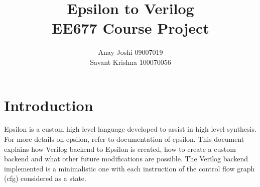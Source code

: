 \documentclass{article}
\begin{document}
    \title{\textbf{Epsilon to Verilog}\\[0.5cm] \large EE677 Course Project}
    \author{Anay Joshi 09007019\\Savant Krishna 100070056}
    \maketitle
    \newpage
    \section{Introduction}
        Epsilon is a custom high level language developed to assist in high level synthesis. For more details on epsilon, refer to documentation of epsilon. This document explains how Verilog backend to Epsilon is created, how to create a custom backend and what other future modifications are possible. The Verilog backend implemented is a minimalistic one with each instruction of the control flow graph (cfg) considered as a state.
    
\end{document}
